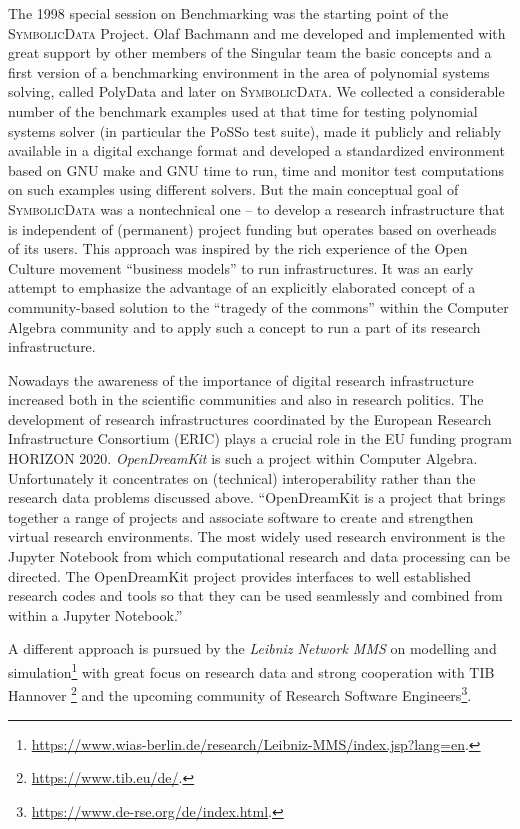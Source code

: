 \documentclass[a4paper,11pt]{article}
\def\SD{\textsc{SymbolicData}}
\begin{document}
The 1998 special session on Benchmarking was the starting point of the {\SD}
Project. Olaf Bachmann and me developed and implemented with great support by
other members of the Singular team the basic concepts and a first version of a
benchmarking environment in the area of polynomial systems solving, called {\sc
  PolyData} and later on {\SD}.  We collected a considerable number of the
benchmark examples used at that time for testing polynomial systems solver (in
particular the PoSSo test suite), made it publicly and reliably available in a
digital exchange format and developed a standardized environment based on GNU
make and GNU time to run, time and monitor test computations on such examples
using different solvers. But the main conceptual goal of {\SD} was a
nontechnical one – to develop a research infrastructure that is independent of
(permanent) project funding but operates based on overheads of its users. This
approach was inspired by the rich experience of the Open Culture movement
“business models” to run infrastructures. It was an early attempt to emphasize
the advantage of an explicitly elaborated concept of a community-based solution
to the “tragedy of the commons” within the Computer Algebra community and to
apply such a concept to run a part of its research infrastructure.

Nowadays the awareness of the importance of digital research infrastructure
increased both in the scientific communities and also in research politics.
The development of research infrastructures coordinated by the European
Research Infrastructure Consortium (ERIC) plays a crucial role in the EU
funding program HORIZON 2020. \emph{OpenDreamKit} is such a project within
Computer Algebra.  Unfortunately it concentrates on (technical)
interoperability rather than the research data problems discussed above.
``OpenDreamKit is a project that brings together a range of projects and
associate software to create and strengthen virtual research environments. The
most widely used research environment is the Jupyter Notebook from which
computational research and data processing can be directed. The OpenDreamKit
project provides interfaces to well established research codes and tools so
that they can be used seamlessly and combined from within a Jupyter Notebook.''

A different approach is pursued by the \emph{Leibniz Network MMS} on modelling
and
simulation\footnote{\url{https://www.wias-berlin.de/research/Leibniz-MMS/index.jsp?lang=en}.}
with great focus on research data and strong cooperation with TIB
Hannover \footnote{\url{https://www.tib.eu/de/}.} and the upcoming community of 
Research Software
Engineers\footnote{\url{https://www.de-rse.org/de/index.html}.}. 
\end{document}
